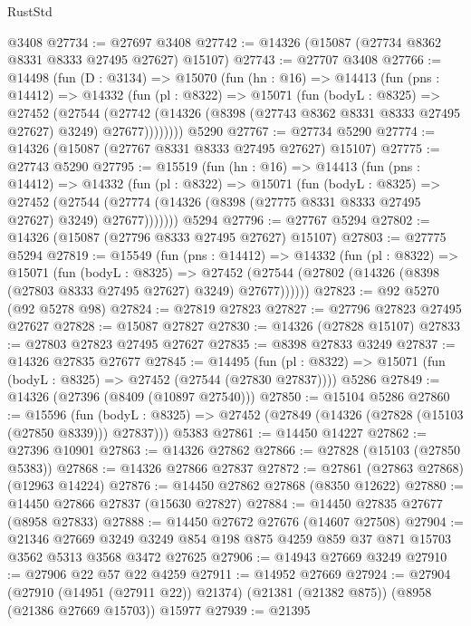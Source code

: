 \begin{lexlean}{RustStd}
\begin{coremodule}
    @3408
@27734 := @27697 @3408
@27742 := @14326 (@15087 (@27734 @8362 @8331 @8333 @27495 @27627) @15107)
@27743 := @27707 @3408
@27766 := @14498
    (fun (D : @3134) =>
    @15070
      (fun (hn : @16) =>
      @14413
        (fun (pns : @14412) =>
        @14332
          (fun (pl : @8322) =>
          @15071
            (fun (bodyL : @8325) =>
            @27452
              (@27544
                (@27742
                  (@14326 (@8398 (@27743 @8362 @8331 @8333 @27495 @27627) @3249) @27677))))))))
    @5290
@27767 := @27734 @5290
@27774 := @14326 (@15087 (@27767 @8331 @8333 @27495 @27627) @15107)
@27775 := @27743 @5290
@27795 := @15519
    (fun (hn : @16) =>
    @14413
      (fun (pns : @14412) =>
      @14332
        (fun (pl : @8322) =>
        @15071
          (fun (bodyL : @8325) =>
          @27452
            (@27544 (@27774 (@14326 (@8398 (@27775 @8331 @8333 @27495 @27627) @3249) @27677)))))))
    @5294
@27796 := @27767 @5294
@27802 := @14326 (@15087 (@27796 @8333 @27495 @27627) @15107)
@27803 := @27775 @5294
@27819 := @15549
    (fun (pns : @14412) =>
    @14332
      (fun (pl : @8322) =>
      @15071
        (fun (bodyL : @8325) =>
        @27452 (@27544 (@27802 (@14326 (@8398 (@27803 @8333 @27495 @27627) @3249) @27677))))))
@27823 := @92 @5270 (@92 @5278 @98)
@27824 := @27819 @27823
@27827 := @27796 @27823 @27495 @27627
@27828 := @15087 @27827
@27830 := @14326 (@27828 @15107)
@27833 := @27803 @27823 @27495 @27627
@27835 := @8398 @27833 @3249
@27837 := @14326 @27835 @27677
@27845 := @14495
    (fun (pl : @8322) => @15071 (fun (bodyL : @8325) => @27452 (@27544 (@27830 @27837))))
    @5286
@27849 := @14326 (@27396 (@8409 (@10897 @27540)))
@27850 := @15104 @5286
@27860 := @15596
    (fun (bodyL : @8325) => @27452 (@27849 (@14326 (@27828 (@15103 (@27850 @8339))) @27837)))
    @5383
@27861 := @14450 @14227
@27862 := @27396 @10901
@27863 := @14326 @27862
@27866 := @27828 (@15103 (@27850 @5383))
@27868 := @14326 @27866 @27837
@27872 := @27861 (@27863 @27868) (@12963 @14224)
@27876 := @14450 @27862 @27868 (@8350 @12622)
@27880 := @14450 @27866 @27837 (@15630 @27827)
@27884 := @14450 @27835 @27677 (@8958 @27833)
@27888 := @14450 @27672 @27676 (@14607 @27508)
@27904 := @21346
    @27669
    @3249
    @3249
    @854
    @198
    @875
    @4259
    @859
    @37
    @871
    @15703
    @3562
    @5313
    @3568
    @3472
    @27625
@27906 := @14943 @27669 @3249
@27910 := @27906 @22 @57 @22 @4259
@27911 := @14952 @27669
@27924 := @27904
    (@27910 (@14951 (@27911 @22)) @21374)
    (@21381 (@21382 @875))
    (@8958 (@21386 @27669 @15703))
    @15977
@27939 := @21395

\end{coremodule}
\end{lexlean}
